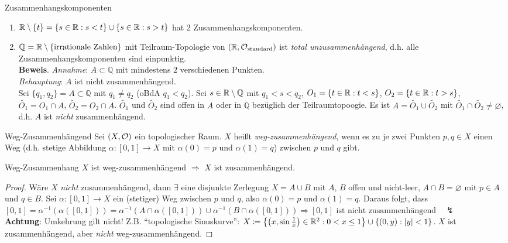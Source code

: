 \begin{example}{Zusammenhangskomponenten}
  \begin{enumerate}
    \item $ \mathbb{R} \setminus \{ t \} = \{ s \in \mathbb{R} : s < t \} \cup \{ s \in \mathbb{R} : s > t \} $ hat 2 Zusammenhangskomponenten.
    \item $ \mathbb{Q} = \mathbb{R} \setminus \{ \text{irrationale Zahlen} \} $ mit Teilraum-Topologie von $ (\mathbb{R}, \mathcal{O}_\text{standard}) $ ist \emph{total unzusammenhängend}, d.h. alle Zusammenhangskomponenten sind einpunktig. \\
    \textbf{Beweis}. \emph{Annahme}: $ A \subset \mathbb{Q} $ mit mindestens $ 2 $ verschiedenen Punkten. \\
    \emph{Behauptung}: $ A $ ist nicht zusammenhängend. \\
    Sei $ \{ q_1, q_2 \} = A \subset \mathbb{Q} $ mit $ q_1 \neq q_2 $ (oBdA $ q_1 < q_2 $). Sei $ s \in \mathbb{R} \setminus \mathbb{Q} $ mit $ q_1 < s < q_2 $, $ O_1 = \{ t \in \mathbb{R}: t < s \} $, $ O_2 = \{ t \in \mathbb{R} : t > s \} $, $ \widetilde{O_1} = O_1 \cap A $, $ \widetilde{O_2} = O_2 \cap A $. $ \widetilde{O_1} $ und $ \widetilde{O_2} $ sind offen in $ A $ oder in $ \mathbb{Q} $ bezüglich der Teilraumtopoogie. Es ist $ A = \widetilde{O_1} \cup \widetilde{O_2} $ mit $ \widetilde{O_1} \cap \widetilde{O_2} \neq \varnothing $, d.h. $ A $ ist \emph{nicht} zusammenhängend.
  \end{enumerate}
\end{example}

\begin{definition}{Weg-Zusammenhängend}
  Sei $ (X, \mathcal{O}) $ ein topologischer Raum. $ X $ heißt \emph{weg-zusammenhängend}, wenn es zu je zwei Punkten $ p, q \in X $ einen Weg (d.h. stetige Abbildung $ \alpha : [0,1] \to X $ mit $ \alpha(0) = p $ und $ \alpha(1) = q $) zwischen $ p $ und $ q $ gibt.
\end{definition}

\begin{lemma}{Weg-Zusammenhang}
  $ X $ ist weg-zusammenhängend $ \Rightarrow $ $ X $ ist zusammenhängend.
  \begin{proof}
    Wäre $ X $ \emph{nicht} zusammenhängend, dann $ \exists $ eine disjunkte Zerlegung $ X = A \cup B $ mit $ A $, $ B $ offen und nicht-leer, $ A \cap B = \varnothing $ mit $ p \in A $ und $ q \in B $. Sei $ \alpha: [0,1] \to X $ ein (stetiger) Weg zwischen $ p $ und $ q $, also $ \alpha(0) = p $ und $ \alpha(1) = q $. Daraus folgt, dass $ [0,1] = \alpha^{-1}(\alpha([0,1])) = \alpha^{-1}(A \cap \alpha([0,1])) \cup \alpha^{-1}(B \cap \alpha([0,1])) \Rightarrow [0,1] \text{ ist nicht zusammenhängend} \quad \lightning $ \\
    \textbf{Achtung}: Umkehrung gilt nicht! Z.B. ``topologische Sinuskurve'': $ X \coloneqq \left\{ \left( x, \sin\tfrac{1}{x} \right) \in \mathbb{R}^2 : 0 < x \leq 1 \right\} \cup \{ (0,y) : \vert y \vert < 1 \} $. $ X $ ist zusammenhängend, aber \emph{nicht} weg-zusammenhängend.
  \end{proof}
\end{lemma}

